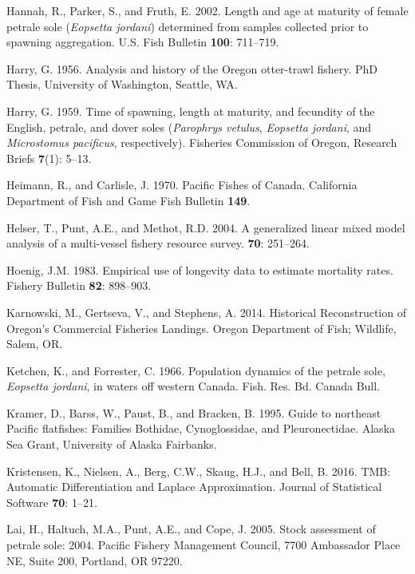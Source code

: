 \documentclass[12pt,]{article}
\begin{document}
\hypertarget{ref-hannah_length_2002}{}
Hannah, R., Parker, S., and Fruth, E. 2002. Length and age at maturity
of female petrale sole (\emph{Eopsetta jordani}) determined from samples
collected prior to spawning aggregation. U.S. Fish Bulletin
\textbf{100}: 711--719.

\hypertarget{ref-harry_analysis_1956}{}
Harry, G. 1956. Analysis and history of the Oregon otter-trawl fishery.
PhD Thesis, University of Washington, Seattle, WA.

\hypertarget{ref-harry_time_1959}{}
Harry, G. 1959. Time of spawning, length at maturity, and fecundity of
the English, petrale, and dover soles (\emph{Parophrys vetulus},
\emph{Eopsetta jordani}, and \emph{Microstomus pacificus},
respectively). Fisheries Commission of Oregon, Research Briefs
\textbf{7}(1): 5--13.

\hypertarget{ref-heimann_pacific_1970}{}
Heimann, R., and Carlisle, J. 1970. Pacific Fishes of Canada. California
Department of Fish and Game Fish Bulletin \textbf{149}.

\hypertarget{ref-helser_generalized_2004}{}
Helser, T., Punt, A.E., and Methot, R.D. 2004. A generalized linear
mixed model analysis of a multi-vessel fishery resource survey.
\textbf{70}: 251--264.

\hypertarget{ref-hoenig_empirical_1983}{}
Hoenig, J.M. 1983. Empirical use of longevity data to estimate mortality
rates. Fishery Bulletin \textbf{82}: 898--903.

\hypertarget{ref-karnowski_historical_2014}{}
Karnowski, M., Gertseva, V., and Stephens, A. 2014. Historical
Reconstruction of Oregon's Commercial Fisheries Landings. Oregon
Department of Fish; Wildlife, Salem, OR.

\hypertarget{ref-ketchen_population_1966}{}
Ketchen, K., and Forrester, C. 1966. Population dynamics of the petrale
sole, \emph{Eopsetta jordani}, in waters off western Canada. Fish. Res.
Bd. Canada Bull.

\hypertarget{ref-kramer_guide_1995}{}
Kramer, D., Barss, W., Paust, B., and Bracken, B. 1995. Guide to
northeast Pacific flatfishes: Families Bothidae, Cynoglossidae, and
Pleuronectidae. Alaska Sea Grant, University of Alaska Fairbanks.

\hypertarget{ref-kristensen_tmb:_2016}{}
Kristensen, K., Nielsen, A., Berg, C.W., Skaug, H.J., and Bell, B. 2016.
TMB: Automatic Differentiation and Laplace Approximation. Journal of
Statistical Software \textbf{70}: 1--21.

\hypertarget{ref-lai_stock_2005}{}
Lai, H., Haltuch, M.A., Punt, A.E., and Cope, J. 2005. Stock assessment
of petrale sole: 2004. Pacific Fishery Management Council, 7700
Ambassador Place NE, Suite 200, Portland, OR 97220.
\end{document}
